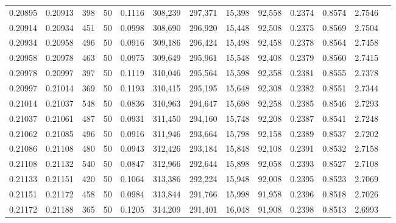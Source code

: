 \begin{tabular}{rrrrrrrrrrrrr}
0.20895 & 0.20913 &   398 &  50 &                                     0.1116 & 308,239 & 297,371 &  15,398 &  92,558 & 0.2374 & 0.8574 & 2.7546 \\
0.20914 & 0.20934 &   451 &  50 &                                     0.0998 & 308,690 & 296,920 &  15,448 &  92,508 & 0.2375 & 0.8569 & 2.7504 \\
0.20934 & 0.20958 &   496 &  50 &                                     0.0916 & 309,186 & 296,424 &  15,498 &  92,458 & 0.2378 & 0.8564 & 2.7458 \\
0.20958 & 0.20978 &   463 &  50 &                                     0.0975 & 309,649 & 295,961 &  15,548 &  92,408 & 0.2379 & 0.8560 & 2.7415 \\
0.20978 & 0.20997 &   397 &  50 &                                     0.1119 & 310,046 & 295,564 &  15,598 &  92,358 & 0.2381 & 0.8555 & 2.7378 \\
0.20997 & 0.21014 &   369 &  50 &                                     0.1193 & 310,415 & 295,195 &  15,648 &  92,308 & 0.2382 & 0.8551 & 2.7344 \\
0.21014 & 0.21037 &   548 &  50 &                                     0.0836 & 310,963 & 294,647 &  15,698 &  92,258 & 0.2385 & 0.8546 & 2.7293 \\
0.21037 & 0.21061 &   487 &  50 &                                     0.0931 & 311,450 & 294,160 &  15,748 &  92,208 & 0.2387 & 0.8541 & 2.7248 \\
0.21062 & 0.21085 &   496 &  50 &                                     0.0916 & 311,946 & 293,664 &  15,798 &  92,158 & 0.2389 & 0.8537 & 2.7202 \\
0.21086 & 0.21108 &   480 &  50 &                                     0.0943 & 312,426 & 293,184 &  15,848 &  92,108 & 0.2391 & 0.8532 & 2.7158 \\
0.21108 & 0.21132 &   540 &  50 &                                     0.0847 & 312,966 & 292,644 &  15,898 &  92,058 & 0.2393 & 0.8527 & 2.7108 \\
0.21133 & 0.21151 &   420 &  50 &                                     0.1064 & 313,386 & 292,224 &  15,948 &  92,008 & 0.2395 & 0.8523 & 2.7069 \\
0.21151 & 0.21172 &   458 &  50 &                                     0.0984 & 313,844 & 291,766 &  15,998 &  91,958 & 0.2396 & 0.8518 & 2.7026 \\
0.21172 & 0.21188 &   365 &  50 &                                     0.1205 & 314,209 & 291,401 &  16,048 &  91,908 & 0.2398 & 0.8513 & 2.6993 \\

\end{tabular}
